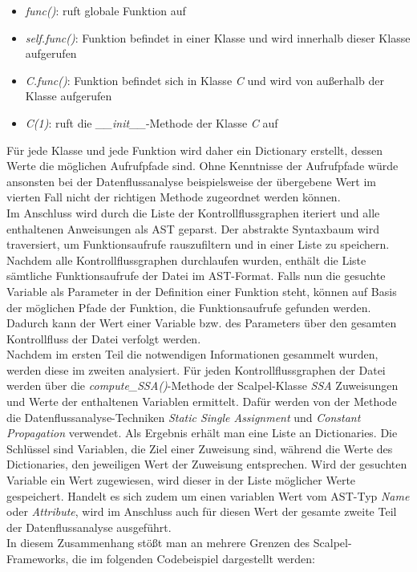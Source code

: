 \documentclass[german,bachelor]{swsLeipzig}
\begin{document}
\begin{itemize}
 \item \textit{func()}: ruft globale Funktion auf
 \item \textit{self.func()}: Funktion befindet in einer Klasse und wird innerhalb dieser Klasse aufgerufen
 \item \textit{C.func()}: Funktion befindet sich in Klasse \textit{C} und wird von außerhalb der Klasse aufgerufen
 \item \textit{C(1)}: ruft die \textit{\_\_init\_\_}-Methode der Klasse \textit{C} auf
\end{itemize}

Für jede Klasse und jede Funktion wird daher ein Dictionary erstellt, dessen Werte die möglichen Aufrufpfade sind.
Ohne Kenntnisse der Aufrufpfade würde ansonsten bei der Datenflussanalyse beispielsweise der übergebene Wert im vierten Fall
nicht der richtigen Methode zugeordnet werden können.\\
\indent Im Anschluss wird durch die Liste der Kontrollflussgraphen iteriert und alle enthaltenen Anweisungen als AST geparst.
Der abstrakte Syntaxbaum wird traversiert, um Funktionsaufrufe rauszufiltern und in einer Liste zu speichern.
Nachdem alle Kontrollflussgraphen durchlaufen wurden, enthält die Liste sämtliche Funktionsaufrufe der Datei im AST-Format.
Falls nun die gesuchte Variable als Parameter in der Definition einer Funktion steht, können auf Basis der möglichen Pfade
der Funktion, die Funktionsaufrufe gefunden werden.
Dadurch kann der Wert einer Variable bzw. des Parameters über den gesamten Kontrollfluss der Datei verfolgt werden.\\

Nachdem im ersten Teil die notwendigen Informationen gesammelt wurden, werden diese im zweiten analysiert.
Für jeden Kontrollflussgraphen der Datei werden über die \textit{compute\_SSA()}-Methode der Scalpel-Klasse \textit{SSA} Zuweisungen
und Werte der enthaltenen Variablen ermittelt.
Dafür werden von der Methode die Datenflussanalyse-Techniken \textit{Static Single Assignment} und \textit{Constant Propagation}
verwendet.
Als Ergebnis erhält man eine Liste an Dictionaries.
Die Schlüssel sind Variablen, die Ziel einer Zuweisung sind, während die Werte des Dictionaries, den jeweiligen Wert der Zuweisung
entsprechen.
Wird der gesuchten Variable ein Wert zugewiesen, wird dieser in der Liste möglicher Werte gespeichert.
Handelt es sich zudem um einen variablen Wert vom AST-Typ \textit{Name} oder \textit{Attribute}, wird im Anschluss auch für diesen Wert
der gesamte zweite Teil der Datenflussanalyse ausgeführt.\\
\indent In diesem Zusammenhang stößt man an mehrere Grenzen des Scalpel-Frameworks, die im folgenden Codebeispiel dargestellt werden:\\
\end{document}
